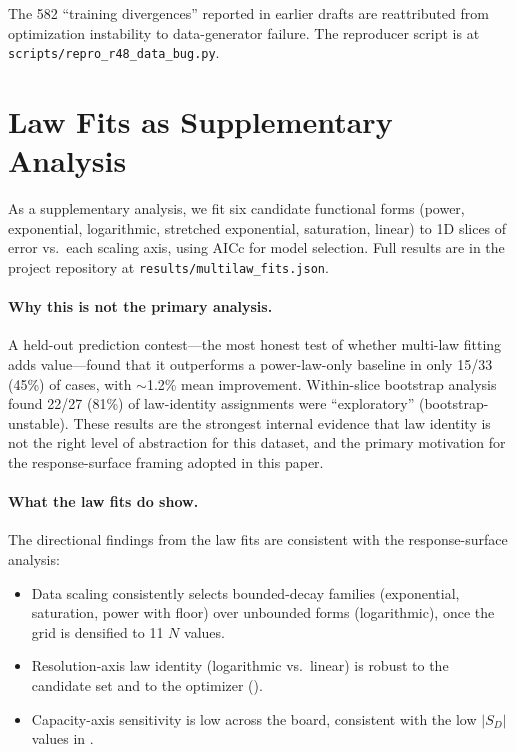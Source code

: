 \documentclass[11pt]{article}
\newcommand{\holdoutWinFraction}{15/33 (45\%)}
\newcommand{\holdoutMeanImprovement}{1.2\%}
\newcommand{\withinSliceUnstableFrac}{22/27 (81\%)}
\begin{document}
\noindent
The 582 ``training divergences'' reported in earlier drafts are
reattributed from optimization instability to data-generator failure.
The reproducer script is at \texttt{scripts/repro\_r48\_data\_bug.py}.


\section{Law Fits as Supplementary Analysis}
\label{app:law-fits}

As a supplementary analysis, we fit six candidate functional forms
(power, exponential, logarithmic, stretched exponential, saturation,
linear) to 1D slices of error vs.\ each scaling axis, using AICc for
model selection. Full results are in the project repository at
\texttt{results/multilaw\_fits.json}.

\paragraph{Why this is not the primary analysis.}
A held-out prediction contest---the most honest test of whether
multi-law fitting adds value---found that it outperforms a
power-law-only baseline in only \holdoutWinFraction{} of cases, with
${\sim}$\holdoutMeanImprovement{} mean improvement. Within-slice
bootstrap analysis found \withinSliceUnstableFrac{} of law-identity
assignments were ``exploratory'' (bootstrap-unstable). These results
are the strongest internal evidence that law identity is not the right
level of abstraction for this dataset, and the primary motivation for
the response-surface framing adopted in this paper.

\paragraph{What the law fits do show.}
The directional findings from the law fits are consistent with the
response-surface analysis:
\begin{itemize}
  \item Data scaling consistently selects bounded-decay families
    (exponential, saturation, power with floor) over unbounded
    forms (logarithmic), once the grid is densified to 11 $N$ values.
  \item Resolution-axis law identity (logarithmic vs.\ linear) is
    robust to the candidate set and to the optimizer ().
  \item Capacity-axis sensitivity is low across the board, consistent
    with the low $|S_D|$ values in .
\end{itemize}
\end{document}
